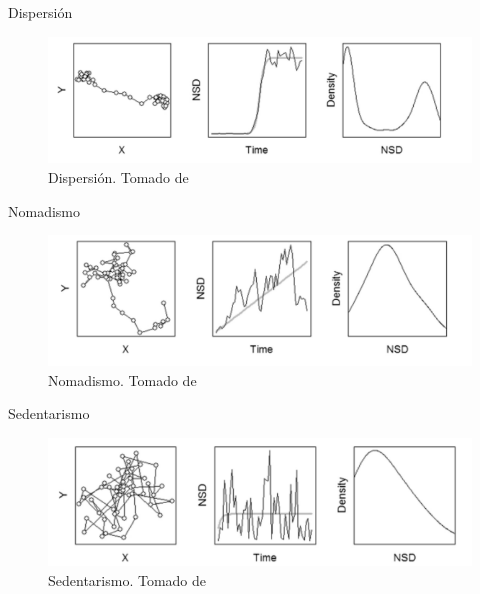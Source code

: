 \documentclass[11pt]{beamer}
\begin{document}
\begin{frame}{Dispersión}
	\begin{figure}
		\includegraphics[scale=0.8]{images/dispersion}
		\caption{Dispersión. Tomado de \cite{bastille2016flexible}}
	\end{figure}
\end{frame}


\begin{frame}{Nomadismo}
	\begin{figure}
		\includegraphics[scale=0.8]{images/nomadismo}
		\caption{Nomadismo. Tomado de \cite{bastille2016flexible}}
	\end{figure}
\end{frame}



\begin{frame}{Sedentarismo}
	\begin{figure}
		\includegraphics[scale=0.8]{images/sedentarismo}
		\caption{Sedentarismo. Tomado de \cite{bastille2016flexible}}
	\end{figure}
\end{frame}
\end{document}
